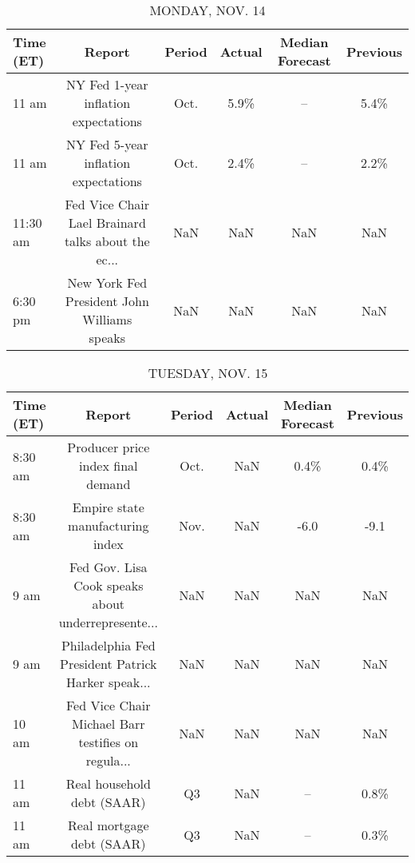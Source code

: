 \documentclass{article}%
\begin{document}
%
\normalsize%


\begin{table}[htbp]%
\caption{MONDAY, NOV. 14}%
\centering%
\begin{adjustbox}{width=1\textwidth}%
\begin{tabular}{lccccc}
\toprule
Time (ET) &                                             Report & Period & Actual & Median Forecast & Previous \\
\midrule
    11 am &               NY Fed 1-year inflation expectations &   Oct. &   5.9\% &              -- &     5.4\% \\
    11 am &               NY Fed 5-year inflation expectations &   Oct. &   2.4\% &              -- &     2.2\% \\
 11:30 am & Fed Vice Chair Lael Brainard talks about the ec... &    NaN &    NaN &             NaN &      NaN \\
  6:30 pm &        New York Fed President John Williams speaks &    NaN &    NaN &             NaN &      NaN \\
\bottomrule
\end{tabular}
%
\end{adjustbox}%
\end{table}

%


\begin{table}[htbp]%
\caption{TUESDAY, NOV. 15}%
\centering%
\begin{adjustbox}{width=1\textwidth}%
\begin{tabular}{lccccc}
\toprule
Time (ET) &                                             Report & Period & Actual & Median Forecast & Previous \\
\midrule
  8:30 am &                  Producer price index final demand &   Oct. &    NaN &            0.4\% &     0.4\% \\
  8:30 am &                   Empire state manufacturing index &   Nov. &    NaN &            -6.0 &     -9.1 \\
     9 am & Fed Gov. Lisa Cook speaks about underrepresente... &    NaN &    NaN &             NaN &      NaN \\
     9 am & Philadelphia Fed President Patrick Harker speak... &    NaN &    NaN &             NaN &      NaN \\
    10 am & Fed Vice Chair Michael Barr testifies on regula... &    NaN &    NaN &             NaN &      NaN \\
    11 am &                         Real household debt (SAAR) &     Q3 &    NaN &              -- &     0.8\% \\
    11 am &                          Real mortgage debt (SAAR) &     Q3 &    NaN &              -- &     0.3\% \\
\bottomrule
\end{tabular}
%
\end{adjustbox}%
\end{table}
\end{document}
